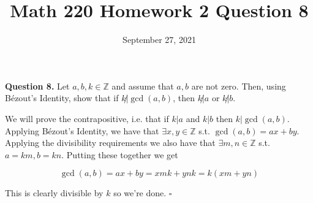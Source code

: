 \documentclass[letterpaper, reqno,11pt]{article}
\newcommand{\ZZ}{\mathbb{Z}}
\begin{document}
\title{Math 220 Homework 2 Question 8}
\date{September 27, 2021}
\maketitle

{\noindent\bf Question 8.} Let $a, b, k\in\ZZ$ and assume that $a, b$ are not zero. Then, using B\'ezout's Identity, show that if $k\not|\gcd(a, b)$, then $k\not|a$ or $k\not|b$. 

\medskip

We will prove the contrapositive, i.e. that if $k|a$ and $k|b$ then $k|\gcd(a, b)$. Applying B\'ezout's Identity, we have that $\exists x, y\in\ZZ$ s.t. $\gcd(a, b)=ax+by$. Applying the divisibility requirements we also have that $\exists m, n\in\ZZ$ s.t. $a=km, b=kn$. Putting these together we get 

$$
    \gcd(a, b)=ax+by=xmk+ynk=k(xm+yn)
$$

This is clearly divisible by $k$ so we're done. $\square$
\end{document}
